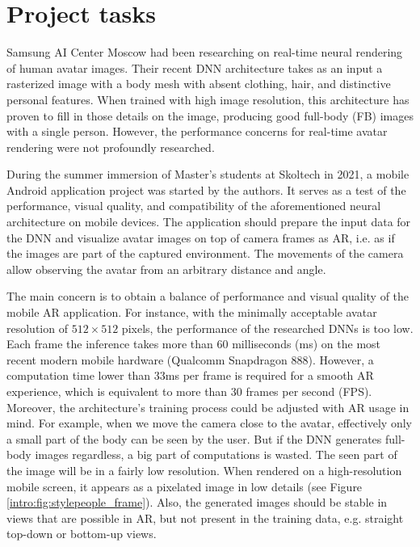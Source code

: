 \section{Project tasks}\label{intro:task}
 
Samsung AI Center Moscow had been researching on real-time neural rendering of human avatar images. Their recent DNN architecture \cite{dnn:stylepeople21} takes as an input a rasterized image with a body mesh with absent clothing, hair, and distinctive personal features. When trained with high image resolution, this architecture has proven to fill in those details on the image, producing good full-body (FB) images with a single person. However, the performance concerns for real-time avatar rendering were not profoundly researched.
 

During the summer immersion of Master's students at Skoltech in 2021, a mobile Android application project was started by the authors. It serves as a test of the performance, visual quality, and compatibility of the aforementioned neural architecture on mobile devices. The application should prepare the input data for the DNN and visualize avatar images on top of camera frames as AR, i.e. as if the images are part of the captured environment. The movements of the camera allow observing the avatar from an arbitrary distance and angle.
 
The main concern is to obtain a balance of performance and visual quality of the mobile AR application. For instance, with the minimally acceptable avatar resolution of $512\times512$ pixels, the performance of the researched DNNs is too low. Each frame the inference takes more than 60 milliseconds (ms) on the most recent modern mobile hardware (Qualcomm Snapdragon 888). However, a computation time lower than 33ms per frame is required for a smooth AR experience, which is equivalent to more than 30 frames per second (FPS). Moreover, the architecture's training process could be adjusted with AR usage in mind. For example, when we move the camera close to the avatar, effectively only a small part of the body can be seen by the user. But if the DNN generates full-body images regardless, a big part of computations is wasted. The seen part of the image will be in a fairly low resolution. When rendered on a high-resolution mobile screen, it appears as a pixelated image in low details (see Figure \ref{intro:fig:stylepeople_frame}\protect{}). Also, the generated images should be stable in views that are possible in AR, but not present in the training data, e.g. straight top-down or bottom-up views. 

